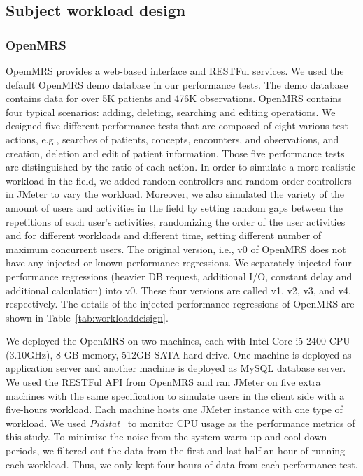\subsection{Subject workload design}
\subsubsection{OpenMRS}
OpemMRS provides a web-based interface and RESTFul services. We used the default OpenMRS demo database in our performance tests. The demo database contains data for over 5K patients and 476K observations. OpenMRS contains four typical scenarios: adding, deleting, searching and editing operations. We designed five different performance tests that are composed of eight various test actions, e.g., searches of patients, concepts, encounters, and observations, and creation, deletion and edit of patient information. Those five performance tests are distinguished by the ratio of each action. In order to simulate a more realistic workload in the field, we added random controllers and random order controllers in JMeter to vary the workload. Moreover, we also simulated the variety of the amount of users and activities in the field by setting random gaps between the repetitions of each user’s activities, randomizing the order of the user activities and for different workloads and different time, setting different number of maximum concurrent users. The original version, i.e., v0 of OpenMRS does not have any injected or known performance regressions. We separately injected four performance regressions (heavier DB request, additional I/O, constant delay and additional calculation) into v0. These four versions are called v1, v2, v3, and v4, respectively. The details of the injected performance regressions of OpenMRS are shown in Table~\ref{tab:workloaddeisign}.

We deployed the OpenMRS on two machines, each with Intel Core i5-2400 CPU (3.10GHz), 8 GB memory, 512GB SATA hard drive. One machine is deployed as application server and another machine is deployed as MySQL database server. We used the RESTFul API from OpenMRS and ran JMeter on five extra machines with the same specification to simulate users in the client side with a five-hours workload. Each machine hosts one JMeter instance with one type of workload. We used \emph{Pidstat}~\citep{pidstat} to monitor CPU usage as the performance metrics of this study.
To minimize the noise from the system warm-up and cool-down periods, we filtered out the data from the first and last half an hour of running each workload. Thus, we only kept four hours of data from each performance test.


